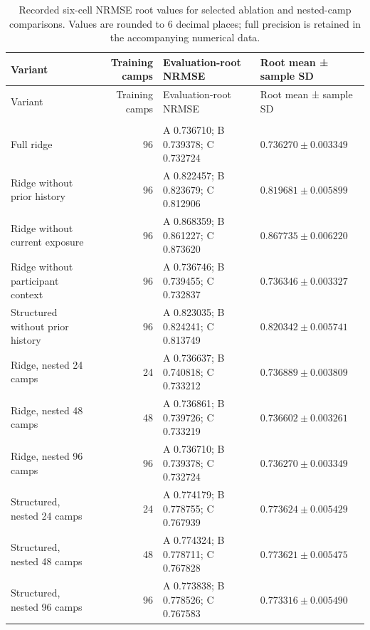 \footnotesize
\setlength{\tabcolsep}{2.0pt}
\renewcommand{\arraystretch}{1.12}
\begin{longtable}{>{\raggedright\arraybackslash}p{1.30in}r>{\raggedright\arraybackslash}p{2.45in}>{\raggedright\arraybackslash}p{1.45in}}
\caption{Recorded six-cell NRMSE root values for selected ablation and nested-camp comparisons. Values are rounded to 6 decimal places; full precision is retained in the accompanying numerical data.}\label{supp:sample-efficiency}\\
\toprule
Variant & Training camps & Evaluation-root NRMSE & Root mean ± sample SD \\
\midrule
\endfirsthead
\toprule
Variant & Training camps & Evaluation-root NRMSE & Root mean ± sample SD \\
\midrule
\endhead
\midrule
\multicolumn{4}{r}{Continued on next page}\\
\endfoot
\bottomrule
\endlastfoot
Full ridge & 96 & A 0.736710; B 0.739378; C 0.732724 & $0.736270\pm0.003349$ \\
Ridge without prior history & 96 & A 0.822457; B 0.823679; C 0.812906 & $0.819681\pm0.005899$ \\
Ridge without current exposure & 96 & A 0.868359; B 0.861227; C 0.873620 & $0.867735\pm0.006220$ \\
Ridge without participant context & 96 & A 0.736746; B 0.739455; C 0.732837 & $0.736346\pm0.003327$ \\
Structured without prior history & 96 & A 0.823035; B 0.824241; C 0.813749 & $0.820342\pm0.005741$ \\
Ridge, nested 24 camps & 24 & A 0.736637; B 0.740818; C 0.733212 & $0.736889\pm0.003809$ \\
Ridge, nested 48 camps & 48 & A 0.736861; B 0.739726; C 0.733219 & $0.736602\pm0.003261$ \\
Ridge, nested 96 camps & 96 & A 0.736710; B 0.739378; C 0.732724 & $0.736270\pm0.003349$ \\
Structured, nested 24 camps & 24 & A 0.774179; B 0.778755; C 0.767939 & $0.773624\pm0.005429$ \\
Structured, nested 48 camps & 48 & A 0.774324; B 0.778711; C 0.767828 & $0.773621\pm0.005475$ \\
Structured, nested 96 camps & 96 & A 0.773838; B 0.778526; C 0.767583 & $0.773316\pm0.005490$ \\
\end{longtable}
